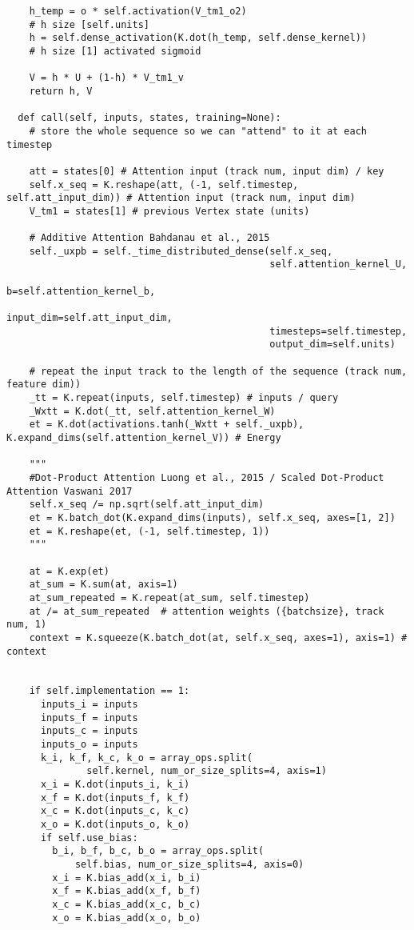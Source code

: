 \begin{lstlisting}
    h_temp = o * self.activation(V_tm1_o2)
    # h size [self.units]
    h = self.dense_activation(K.dot(h_temp, self.dense_kernel))
    # h size [1] activated sigmoid

    V = h * U + (1-h) * V_tm1_v
    return h, V

  def call(self, inputs, states, training=None):
    # store the whole sequence so we can "attend" to it at each timestep

    att = states[0] # Attention input (track num, input dim) / key
    self.x_seq = K.reshape(att, (-1, self.timestep, self.att_input_dim)) # Attention input (track num, input dim)
    V_tm1 = states[1] # previous Vertex state (units)

    # Additive Attention Bahdanau et al., 2015
    self._uxpb = self._time_distributed_dense(self.x_seq,
                                              self.attention_kernel_U,
                                              b=self.attention_kernel_b,
                                              input_dim=self.att_input_dim,
                                              timesteps=self.timestep,
                                              output_dim=self.units)

    # repeat the input track to the length of the sequence (track num, feature dim))
    _tt = K.repeat(inputs, self.timestep) # inputs / query
    _Wxtt = K.dot(_tt, self.attention_kernel_W)
    et = K.dot(activations.tanh(_Wxtt + self._uxpb), K.expand_dims(self.attention_kernel_V)) # Energy

    """
    #Dot-Product Attention Luong et al., 2015 / Scaled Dot-Product Attention Vaswani 2017
    self.x_seq /= np.sqrt(self.att_input_dim)
    et = K.batch_dot(K.expand_dims(inputs), self.x_seq, axes=[1, 2])
    et = K.reshape(et, (-1, self.timestep, 1))
    """

    at = K.exp(et)
    at_sum = K.sum(at, axis=1)
    at_sum_repeated = K.repeat(at_sum, self.timestep)
    at /= at_sum_repeated  # attention weights ({batchsize}, track num, 1)
    context = K.squeeze(K.batch_dot(at, self.x_seq, axes=1), axis=1) # context


    if self.implementation == 1:
      inputs_i = inputs
      inputs_f = inputs
      inputs_c = inputs
      inputs_o = inputs
      k_i, k_f, k_c, k_o = array_ops.split(
              self.kernel, num_or_size_splits=4, axis=1)
      x_i = K.dot(inputs_i, k_i)
      x_f = K.dot(inputs_f, k_f)
      x_c = K.dot(inputs_c, k_c)
      x_o = K.dot(inputs_o, k_o)
      if self.use_bias:
        b_i, b_f, b_c, b_o = array_ops.split(
            self.bias, num_or_size_splits=4, axis=0)
        x_i = K.bias_add(x_i, b_i)
        x_f = K.bias_add(x_f, b_f)
        x_c = K.bias_add(x_c, b_c)
        x_o = K.bias_add(x_o, b_o)


\end{lstlisting}
